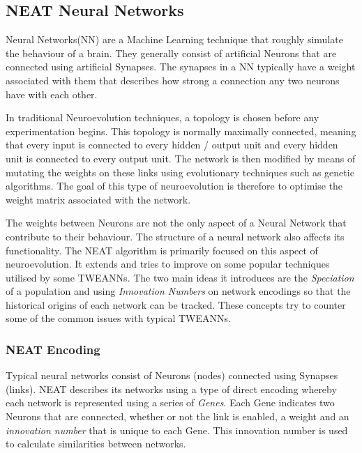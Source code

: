 \documentclass[]{Learning-to-Play-Wolfenstein-thesis}
\begin{document}
			
\subsection{NEAT Neural Networks}
Neural Networks(NN) are a Machine Learning technique that roughly simulate the behaviour of a brain. They generally consist of artificial Neurons that are connected using artificial Synapses. The synapses in a NN typically have a weight associated with them that describes how strong a connection any two neurons have with each other.

In traditional Neuroevolution techniques, a topology is chosen before any experimentation begins. This topology is normally maximally connected, meaning that every input is connected to every hidden / output unit and every hidden unit is connected to every output unit. The network is then modified by means of mutating the weights on these links using evolutionary techniques such as genetic algorithms. The goal of this type of neuroevolution is therefore to optimise the weight matrix associated with the network.

The weights between Neurons are not the only aspect of a Neural Network that contribute to their behaviour. The structure of a neural network also affects its functionality. The NEAT algorithm is primarily focused on this aspect of neuroevolution. It extends and tries to improve on some popular techniques utilised by some TWEANNs. The two main ideas it introduces are the \textit{Speciation} of a population and using \textit{Innovation Numbers} on network encodings so that the historical origins of each network can be tracked. These concepts try to counter some of the common issues with typical TWEANNs.\\

\subsubsection{NEAT Encoding}
Typical neural networks consist of Neurons (nodes) connected using Synapses (links). NEAT describes its networks using a type of direct encoding whereby each network is represented using a series of \textit{Genes}. Each Gene indicates two Neurons that are connected, whether or not the link is enabled, a weight and an \textit{innovation number} that is unique to each Gene. This innovation number is used to calculate similarities between networks. 
\end{document}
